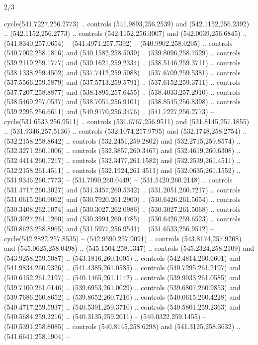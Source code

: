 \begin{flagdescription}{2/3}
\begin{scope}[xshift=0.5\flaglength,yshift=0.5\flagwidth,scale=\flagwidth/495.65]
\begin{scope}[y=0.8pt, x=0.8pt, yscale=-1,shift={(-463.76,-309.78)}]
  cycle(541.7227,256.2773) .. controls (541.9893,256.2539) and
  (542.1152,256.2392) .. (542.1152,256.2773) .. controls (542.1152,256.3007) and
  (542.0039,256.6845) .. (541.8340,257.0654) -- (541.4971,257.7392) --
  (540.9902,258.0205) .. controls (540.7002,258.1816) and (540.1582,258.5039) ..
  (539.8096,258.7529) .. controls (539.2119,259.1777) and (539.1621,259.2334) ..
  (538.5146,259.3711) .. controls (538.1338,259.4502) and (537.7412,259.5088) ..
  (537.6709,259.5381) .. controls (537.5566,259.5879) and (537.5713,259.5791) ..
  (537.6152,259.3711) .. controls (537.7207,258.8877) and (538.1895,257.6455) ..
  (538.4033,257.2910) .. controls (538.5469,257.0537) and (538.7051,256.9101) ..
  (538.8545,256.8398) .. controls (539.2295,256.6611) and (540.9170,256.3476) ..
  (541.7227,256.2773) -- cycle(531.6533,256.9511) .. controls
  (531.6767,256.9511) and (531.8145,257.1855) .. (531.9346,257.5136) .. controls
  (532.1074,257.9795) and (532.1748,258.2754) .. (532.2158,258.8642) .. controls
  (532.2451,259.2802) and (532.2715,259.8574) .. (532.3271,260.1006) .. controls
  (532.3857,260.3467) and (532.4619,260.6308) .. (532.4414,260.7217) .. controls
  (532.3477,261.1582) and (532.2539,261.4511) .. (532.2158,261.4511) .. controls
  (532.1924,261.4511) and (532.0635,261.1552) .. (531.9346,260.7773) --
  (531.7090,260.0449) -- (531.5420,260.2148) .. controls (531.4717,260.3027) and
  (531.3457,260.5342) .. (531.2051,260.7217) .. controls (531.0615,260.9062) and
  (530.7920,261.2900) .. (530.6426,261.5654) .. controls (530.3408,262.1074) and
  (530.3027,262.0986) .. (530.3027,261.5068) .. controls (530.3027,261.1260) and
  (530.3994,260.4785) .. (530.6426,259.6523) .. controls (530.8623,258.8965) and
  (531.5977,256.9541) .. (531.6533,256.9512) -- cycle(542.2822,257.8535) --
  (542.9590,257.9091) .. controls (543.8174,257.9208) and (545.0625,258.0498) ..
  (545.1504,258.1347) .. controls (545.2324,258.2109) and (543.9258,259.5087) ..
  (543.1816,260.1005) .. controls (542.4814,260.6601) and (541.9834,260.9326) ..
  (541.4385,261.0585) .. controls (540.7295,261.2197) and (540.6152,261.2197) ..
  (540.1465,261.1142) .. controls (539.9033,261.0585) and (539.7100,261.0146) ..
  (539.6953,261.0029) .. controls (539.6807,260.9853) and (539.7686,260.8652) ..
  (539.8652,260.7216) .. controls (540.0615,260.4228) and (540.4717,259.5937) ..
  (540.5391,259.3710) .. controls (540.5801,259.2363) and (540.5684,259.2216) ..
  (540.3135,259.2011) -- (540.0322,259.1455) -- (540.5391,258.8085) .. controls
  (540.8145,258.6298) and (541.3125,258.3632) .. (541.6641,258.1904) --

\end{scope}
\end{scope}
\end{flagdescription}
